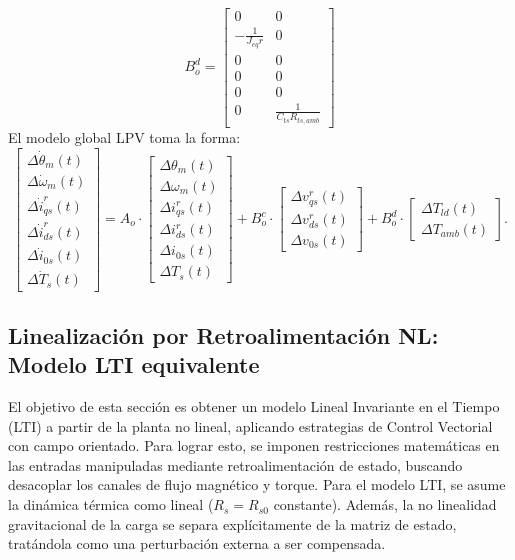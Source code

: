 \documentclass[12pt, a4paper,journal, onecolumn, compsoc]{IEEEtran}
\begin{document}
\begin{equation*}
B_o^d = \begin{bmatrix}
0 & 0 \\
-\frac{1}{J_{eq} r} & 0 \\
0 & 0 \\
0 & 0 \\
0 & 0 \\
0 & \frac{1}{C_{ts} R_{ts,amb}}
\end{bmatrix} 
\end{equation*}
El modelo global LPV toma la forma:
\begin{equation}
\begin{bmatrix}
\Delta \dot{\theta}_m(t) \\
\Delta \dot{\omega}_m(t) \\
\Delta \dot{i}_{qs}^r(t) \\
\Delta \dot{i}_{ds}^r(t) \\
\Delta \dot{i}_{0s}(t) \\
\Delta \dot{T}_s(t)
\end{bmatrix} = A_o \cdot 
\begin{bmatrix}
\Delta \theta_m(t) \\
\Delta \omega_m(t) \\
\Delta i_{qs}^r(t) \\
\Delta i_{ds}^r(t) \\
\Delta i_{0s}(t) \\
\Delta T_s(t)
\end{bmatrix} + B_o^c \cdot 
\begin{bmatrix}
\Delta v_{qs}^r(t) \\
\Delta v_{ds}^r(t) \\
\Delta v_{0s}(t)
\end{bmatrix} + B_o^d \cdot 
\begin{bmatrix}
\Delta T_{ld}(t) \\
\Delta T_{amb}(t)
\end{bmatrix} .
\end{equation}


\subsection{Linealización por Retroalimentación NL: Modelo LTI equivalente}
El objetivo de esta sección es obtener un modelo Lineal Invariante en el Tiempo (LTI) a partir de la planta no lineal, aplicando estrategias de Control Vectorial con campo orientado. Para lograr esto, se imponen restricciones matemáticas en las entradas manipuladas mediante retroalimentación de estado, buscando desacoplar los canales de flujo magnético y torque. Para el modelo LTI, se asume la dinámica térmica como lineal ($R_s = R_{s0}$ constante). Además, la no linealidad gravitacional de la carga se separa explícitamente de la matriz de estado, tratándola como una perturbación externa a ser compensada.
\end{document}
